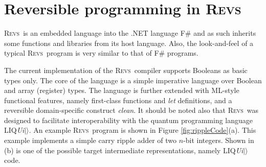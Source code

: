 \documentclass[conference]{IEEEtran}
\newcommand{\REVS}{{\textsc{Revs}}}
\newcommand{\LIQUID}{{LIQ{\em Ui}$|\rangle$}}
\newcommand{\nix}[1]{{}}
\newcommand{\N}{{\mathbb{N}}}
\renewcommand{\textsf}[1]{\textrm{#1}}
\newcommand{\rlet}[3]{\textsf{let } #1 = #2 \textsf{ in } #3}
\newcommand{\rfun}[2]{\lambda #1.#2}
\newcommand{\rapply}[2]{(#1\; #2)}
\newcommand{\rseq}[2]{#1; #2}
\newcommand{\rif}[3]{\textsf{if } #1 \textsf{ then } #2 \textsf{ else } #3}
\newcommand{\rfor}[4]{\textsf{for } #1 \textsf{ in } #2..#3 \textsf{ do } #4}
\newcommand{\rassign}[2]{#1\leftarrow#2}
\newcommand{\rtrue}{\textsf{true}}
\newcommand{\rfalse}{\textsf{false}}
\newcommand{\runit}{\textsf{unit}}
\newcommand{\rxor}[2]{#1\textsf{ $<>$ }#2}
\newcommand{\rand}[2]{#1\textsf{ \&\& }#2}
\newcommand{\rregister}[2]{\textsf{register } #1 \dots #2}
\newcommand{\rindex}[2]{#1.[#2]}
\newcommand{\rslice}[3]{#1.[#2..#3]}
\newcommand{\rappend}[2]{\textsf{append } #1\; #2}
\newcommand{\rrotate}[2]{\textsf{rotate } #1\; #2}
\newcommand{\rclean}[1]{\textsf{clean } #1}
\newcommand{\rassert}[1]{\textsf{assert } #1}
\begin{document}
\section{Reversible programming in \REVS} 

\REVS~is an embedded language into the .NET language F\# and as such inherits some functions and libraries from its host language. Also, the look-and-feel of a typical \REVS~program is very similar to that of F\# programs. 
\nix{The abstract syntax of \REVS~is as follows: 
\begin{flalign*}
	{\bf Var} \;&x \quad {\bf Nat} \;i, j\in\N \quad \;{\bf Loc} \;l\in\N \\
	{\bf Val} \;&v ::= \runit \| l \| \rregister{l_1}{l_n} \| \rfun{x}{t} & \\
		{\bf Term} \; &t ::= \rlet{x}{t_1}{t_2} \| \rfun{x}{t} \| \rapply{t_1}{t_2} \| \rseq{t_1}{t_2} \| x \| \rassign{t_1}{t_2}& \\
			&\hspace{0.0em}|\; \rtrue \| \rfalse \| \rxor{t_1}{t_2} \|  \rand{t_1}{t_2} \| \rclean{t} \| \rassert{t} & \\ %
			&\hspace{0.0em}|\; \rregister{t_1}{t_n}\! \| \rindex{t}{i} \| \rslice{t}{i}{j} \| \rappend{t_1\!}{t_2}\! \| \rrotate{i}{t} &
\end{flalign*}

 Shown is a grammar, i.e., a set of production rules. Variables are denoted by {\bf Var}, values by {\bf Val}, and terms by {\bf Term}.}

 The current implementation of the \REVS~compiler supports Booleans as basic types only. The core of the language is a simple imperative language over Boolean and array (register) types. The language is further extended with ML-style functional features, namely first-class functions and \emph{let} definitions, and a reversible domain-specific construct \emph{clean}. It should be noted also that \REVS~was designed to facilitate interoperability with the quantum programming language \LIQUID{}.
An example \REVS~program is shown in Figure \ref{fig:rippleCode}(a). This example implements a simple carry ripple adder of two $n$-bit integers. Shown in (b) is one of the possible target intermediate representations, namely \LIQUID{} code. 
\end{document}
